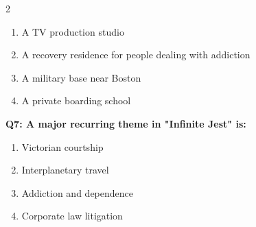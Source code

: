 \documentclass[10pt]{article}
\begin{document}
\begin{multicols}{2}
\begin{enumerate}[label=\arabic*.]
\item A TV production studio
\item A recovery residence for people dealing with addiction
\item A military base near Boston
\item A private boarding school
\end{enumerate}
\textbf{Q7: A major recurring theme in "Infinite Jest" is:}

\begin{enumerate}[label=\arabic*.]
\item Victorian courtship
\item Interplanetary travel
\item Addiction and dependence
\item Corporate law litigation
\end{enumerate}
\end{multicols}
\end{document}
